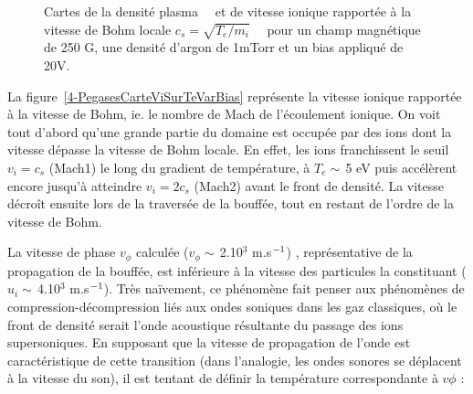 \begin{refsection}
\begin{figure}[!htbp] 
  \centering
    \caption{Cartes de la densité plasma~~ et
    de vitesse ionique rapportée à la
    vitesse de Bohm locale
    $c_s=\sqrt{T_e/m_i}$~~ pour un champ
    magnétique de 250 G, une densité d'argon de 1mTorr et un bias appliqué de
    20V.}
    \label{4-PegasesVaguesIoniques}
\end{figure}
 
 La figure~\ref{4-PegasesCarteViSurTeVarBias} représente la vitesse ionique
 rapportée à la vitesse de Bohm, ie. le nombre de Mach de
 l'écoulement ionique. On voit tout d'abord qu'une grande partie du domaine est
 occupée par des ions dont la vitesse dépasse la vitesse de Bohm locale. En
 effet, les ions franchissent le seuil $v_i=c_s$ (Mach1) le long du gradient de
 température, à $T_e\sim\,$5 eV puis accélèrent encore jusqu'à atteindre
 $v_i=2c_s$ (Mach2) avant le front de densité. La vitesse décroît ensuite lors
 de la traversée de la bouffée, tout en restant de l'ordre de la vitesse de
 Bohm.
 
 La vitesse de phase $v_\phi$ calculée ($v_\phi\sim\,$2.10$^3$
 m.s$^{{-1}}$) , représentative de la propagation de la bouffée, est inférieure à la
 vitesse des particules la constituant ($u_i\sim\,$4.10$^3$
 m.s$^{{-1}}$). Très naïvement, ce phénomène fait penser aux phénomènes
 de compression-décompression liés aux ondes soniques dans les gaz
 classiques, où le front de densité serait l'onde acoustique
 résultante du passage des ions supersoniques. En supposant que la vitesse de
 propagation de l'onde est caractéristique de cette transition (dans
 l'analogie, les ondes sonores se déplacent à la vitesse du son), il est tentant de définir la température correspondante à $v\phi$ :
 

\end{refsection}
